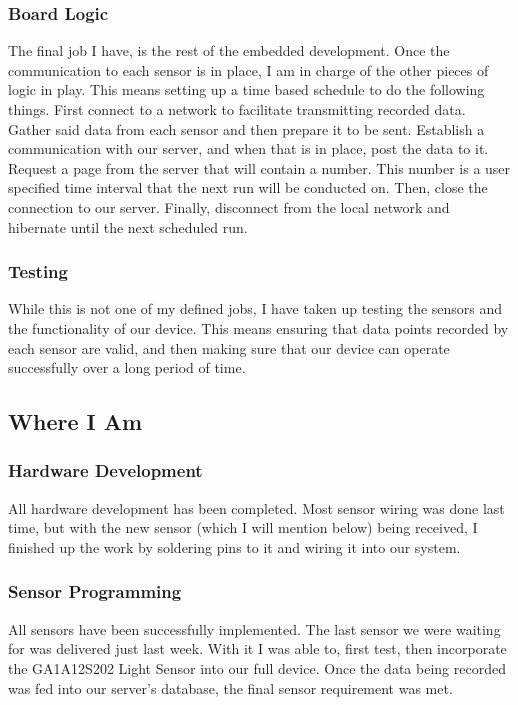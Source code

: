 \documentclass[IEEEtran,letterpaper,10pt,titlepage,fleqn,draftclsnofoot,onecolumn]{article}
\begin{document}
\subsubsection{Board Logic}

The final job I have, is the rest of the embedded development. Once the communication to each sensor is in place, I am in charge of the other pieces of logic in play. This means setting up a time based schedule to do the following things. First connect to a network to facilitate transmitting recorded data. Gather said data from each sensor and then prepare it to be sent. Establish a communication with our server, and when that is in place, post the data to it. Request a page from the server that will contain a number. This number is a user specified time interval that the next run will be conducted on. Then, close the connection to our server. Finally, disconnect from the local network and hibernate until the next scheduled run.

\subsubsection{Testing}

While this is not one of my defined jobs, I have taken up testing the sensors and the functionality of our device. This means ensuring that data points recorded by each sensor are valid, and then making sure that our device can operate successfully over a long period of time.

\subsection{Where I Am}

\subsubsection{Hardware Development}

All hardware development has been completed. Most sensor wiring was done last time, but with the new sensor (which I will mention below) being received, I finished up the work by soldering pins to it and wiring it into our system.

\subsubsection{Sensor Programming}

All sensors have been successfully implemented. The last sensor we were waiting for was delivered just last week. With it I was able to, first test, then incorporate the GA1A12S202 Light Sensor into our full device. Once the data being recorded was fed into our server’s database, the final sensor requirement was met.
\end{document}
